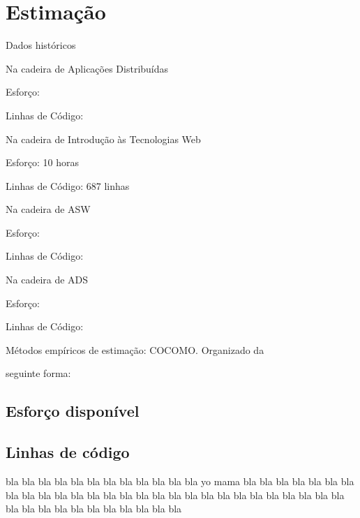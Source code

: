\documentclass[12pt, a4paper, twoside]{report} %
\begin{document}
\clearpage

\section{Estimação}

Dados históricos

Na cadeira de Aplicações Distribuídas 

Esforço: 

Linhas de Código: 

Na cadeira de Introdução às Tecnologias Web 

Esforço: 10 horas 

Linhas de Código: 687 linhas

Na cadeira de ASW 

Esforço: 

Linhas de Código:

Na cadeira de ADS 

Esforço: 

Linhas de Código:

Métodos empíricos de estimação: COCOMO. Organizado da 

seguinte forma:

\subsection{Esforço disponível}

\subsection{Linhas de código}

bla bla bla bla bla bla bla bla bla bla bla bla yo mama bla bla bla bla bla bla bla bla bla bla bla bla bla bla bla bla bla bla bla bla bla bla bla bla bla bla bla bla bla bla bla bla bla bla bla bla bla bla bla 
\end{document}
